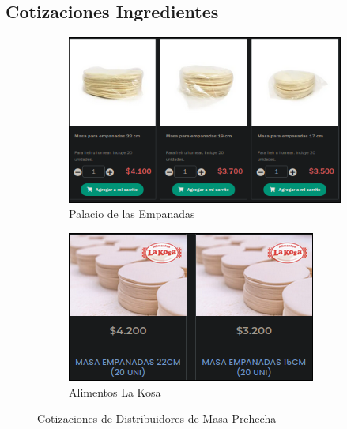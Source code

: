 \documentclass[12pt]{article}
\begin{document}
\subsection{Cotizaciones Ingredientes}
        \begin{figure}[h!] %
            \centering %
            \begin{subfigure}{0.4\textwidth}
                \centering
                \includegraphics[width=0.9\linewidth]{palaci} %
                \caption{Palacio de las Empanadas}
                \label{fig:palacio}
            \end{subfigure}
            \hfill %
            \begin{subfigure}{0.4\textwidth}
                \centering
                \includegraphics[width=0.9\linewidth]{kosa} %
                \caption{Alimentos La Kosa}
                \label{fig:kosa}
            \end{subfigure}
            \caption{Cotizaciones de Distribuidores de Masa Prehecha}
            \label{fig:cotizaciones_masas}
        \end{figure} %
\end{document}
